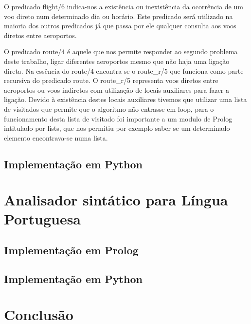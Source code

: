 \documentclass[12pt,a4paper]{report}
\begin{document}
O predicado flight/6 indica-nos a existência ou inexistência da ocorrência de um voo direto num determinado dia ou horário. Este predicado será utilizado na maioria dos outros predicados já que passa por ele qualquer consulta aos voos diretos entre aeroportos.

O predicado route/4 é aquele que nos permite responder ao segundo problema deste trabalho, ligar diferentes aeroportos mesmo que não haja uma ligação direta. Na essência do route/4 encontra-se o route\_r/5 que funciona como parte recursiva do predicado route. O route\_r/5 representa voos diretos entre aeroportos ou voos indiretos com utilização de locais auxiliares para fazer a ligação. Devido à existência destes locais auxiliares tivemos que utilizar uma lista de visitados que permite que o algoritmo não entrasse em loop, para o funcionamento desta lista de visitado foi importante a um modulo de Prolog intitulado por lists, que nos permitiu por exemplo saber se um determinado elemento encontrava-se numa lista.

\subsection{Implementação em Python}
\section{Analisador sintático para Língua Portuguesa}
\subsection{Implementação em Prolog}
\subsection{Implementação em Python}
\section{Conclusão}
\end{document}
